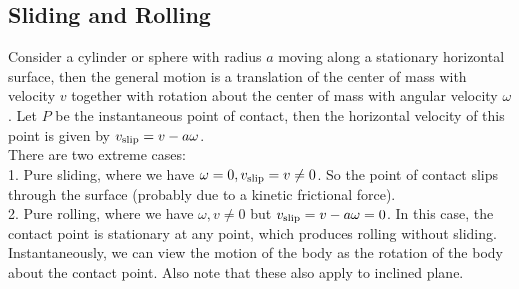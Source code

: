 \subsection{Sliding and Rolling}
Consider a cylinder or sphere with radius $a$ moving along a stationary horizontal surface, then the general motion is a translation of the center of mass with velocity $v$ together with rotation about the center of mass with angular velocity $\omega$.
Let $P$ be the instantaneous point of contact, then the horizontal velocity of this point is given by $v_{\rm slip}=v-a\omega$.\\
There are two extreme cases:\\
1. Pure sliding, where we have $\omega=0,v_{\rm slip}=v\neq 0$.
So the point of contact slips through the surface (probably due to a kinetic frictional force).\\
2. Pure rolling, where we have $\omega,v\neq 0$ but $v_{\rm slip}=v-a\omega=0$.
In this case, the contact point is stationary at any point, which produces rolling without sliding.\\
Instantaneously, we can view the motion of the body as the rotation of the body about the contact point.
Also note that these also apply to inclined plane.
